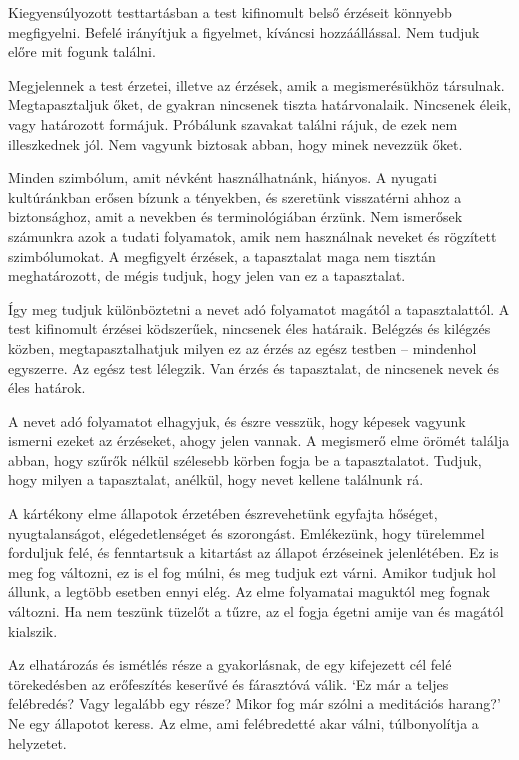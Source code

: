Kiegyensúlyozott testtartásban a test kifinomult belső érzéseit könnyebb
megfigyelni. Befelé irányítjuk a figyelmet, kíváncsi hozzáállással. Nem
tudjuk előre mit fogunk találni.

Megjelennek a test érzetei, illetve az érzések, amik a megismerésükhöz
társulnak. Megtapasztaljuk őket, de gyakran nincsenek tiszta
határvonalaik. Nincsenek éleik, vagy határozott formájuk. Próbálunk
szavakat találni rájuk, de ezek nem illeszkednek jól. Nem vagyunk
biztosak abban, hogy minek nevezzük őket.

Minden szimbólum, amit névként használhatnánk, hiányos. A nyugati
kultúránkban erősen bízunk a tényekben, és szeretünk visszatérni ahhoz a
biztonsághoz, amit a nevekben és terminológiában érzünk. Nem ismerősek
számunkra azok a tudati folyamatok, amik nem használnak neveket és
rögzített szimbólumokat. A megfigyelt érzések, a tapasztalat maga nem
tisztán meghatározott, de mégis tudjuk, hogy jelen van ez a tapasztalat.

Így meg tudjuk különböztetni a nevet adó folyamatot magától a
tapasztalattól. A test kifinomult érzései ködszerűek, nincsenek éles
határaik. Belégzés és kilégzés közben, megtapasztalhatjuk milyen ez az
érzés az egész testben -- mindenhol egyszerre. Az egész test lélegzik.
Van érzés és tapasztalat, de nincsenek nevek és éles határok.

A nevet adó folyamatot elhagyjuk, és észre vesszük, hogy képesek vagyunk
ismerni ezeket az érzéseket, ahogy jelen vannak. A megismerő elme örömét
találja abban, hogy szűrők nélkül szélesebb körben fogja be a
tapasztalatot. Tudjuk, hogy milyen a tapasztalat, anélkül, hogy nevet
kellene találnunk rá.


A kártékony elme állapotok érzetében észrevehetünk egyfajta hőséget,
nyugtalanságot, elégedetlenséget és szorongást. Emlékezünk, hogy
türelemmel forduljuk felé, és fenntartsuk a kitartást az állapot
érzéseinek jelenlétében. Ez is meg fog változni, ez is el fog múlni, és
meg tudjuk ezt várni. Amikor tudjuk hol állunk, a legtöbb esetben ennyi
elég. Az elme folyamatai maguktól meg fognak változni. Ha nem teszünk
tüzelőt a tűzre, az el fogja égetni amije van és magától kialszik.

Az elhatározás és ismétlés része a gyakorlásnak, de egy kifejezett cél
felé törekedésben az erőfeszítés keserűvé és fárasztóvá válik. `Ez már a
teljes felébredés? Vagy legalább egy része? Mikor fog már szólni a
meditációs harang?' Ne egy állapotot keress. Az elme, ami felébredetté
akar válni, túlbonyolítja a helyzetet.

